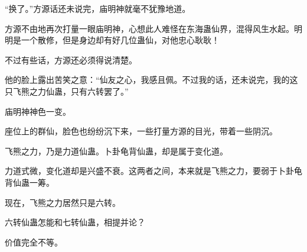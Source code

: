\begin{this_body}
“换了。”方源话还未说完，庙明神就毫不犹豫地道。

方源不由地再次打量一眼庙明神，心想此人难怪在东海蛊仙界，混得风生水起。明明是一个散修，但是身边却有好几位蛊仙，对他忠心耿耿！

不过有些话，方源还必须得说清楚。

他的脸上露出苦笑之意：“仙友之心，我感且佩。不过我的话，还未说完，我的这只飞熊之力仙蛊，只有六转罢了。”

庙明神神色一变。

座位上的群仙，脸色也纷纷沉下来，一些打量方源的目光，带着一些阴沉。

飞熊之力，乃是力道仙蛊。卜卦龟背仙蛊，却是属于变化道。

力道式微，变化道却是兴盛不衰。这两者之间，本来就是飞熊之力，要弱于卜卦龟背仙蛊一筹。

现在，飞熊之力居然只是六转。

六转仙蛊怎能和七转仙蛊，相提并论？

价值完全不等。

\end{this_body}

